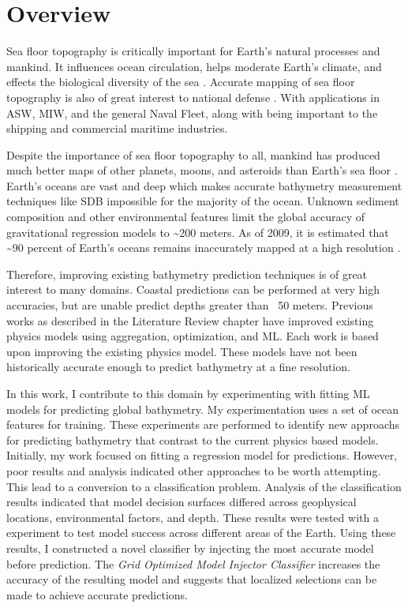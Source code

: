 \section{Overview}
\setlength{\parindent}{10ex}

Sea floor topography is critically important for Earth's natural processes and mankind.
It influences ocean circulation, helps moderate Earth's climate, and effects the biological diversity of the sea \cite{kunze2004role}.
Accurate mapping of sea floor topography is also of great interest to national defense \cite{goodman1982defence}.
With applications in \ac{ASW}, \ac{MIW}, and the general Naval Fleet, along with being important to the shipping and commercial maritime industries.

\par
Despite the importance of sea floor topography to all, mankind has produced much better maps of other planets, moons, and asteroids than Earth's sea floor \cite{becker2009global}.
Earth's oceans are vast and deep which makes accurate bathymetry measurement techniques like \ac{SDB} impossible for the majority of the ocean.
Unknown sediment composition and other environmental features limit the global accuracy of gravitational regression models to \~{}200 meters.
As of 2009, it is estimated that \~{}90 percent of Earth's oceans remains inaccurately mapped at a high resolution \cite{becker2009global}.

\par
Therefore, improving existing bathymetry prediction techniques is of great interest to many domains.
Coastal predictions can be performed at very high accuracies, but are unable predict depths greater than ~50 meters.
Previous works as described in the Literature Review chapter have improved existing physics models using aggregation, optimization, and \ac{ML}.
Each work is based upon improving the existing physics model.
These models have not been historically accurate enough to predict bathymetry at a fine resolution.

\par
In this work, I contribute to this domain by experimenting with fitting \ac{ML} models for predicting global bathymetry.
My experimentation uses a set of ocean features for training.
These experiments are performed to identify new approachs for predicting bathymetry that contrast to the current physics based models.
Initially,  my work focused on fitting a regression model for predictions.
However, poor results and analysis indicated other approaches to be worth attempting.
This lead to a conversion to a classification problem.
Analysis of the classification results indicated that model decision surfaces differed across geophysical locations, environmental factors, and depth.
These results were tested with a experiment to test model success across different areas of the Earth.
Using these results, I constructed a novel classifier by injecting the most accurate model before prediction.
The \textit{Grid Optimized Model Injector Classifier} increases the accuracy of the resulting model and suggests that localized selections can be made to achieve accurate predictions.